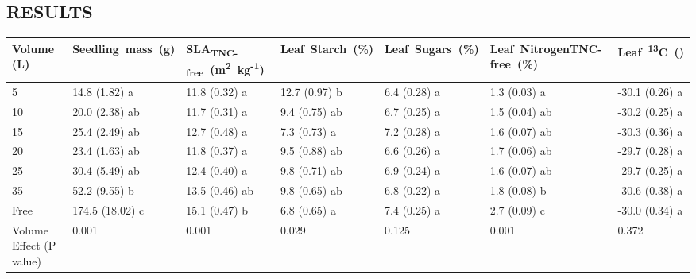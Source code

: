 \documentclass[a4paper]{article}
\begin{document}
\subsection*{RESULTS}

\begin{Schunk}
\begin{Soutput}
\begin{table}
\centering
\label{table:Table1}
\begin{tabular}{lllllll}
  \hline
Volume (L) & Seedling~mass~(g) & SLA\textsubscript{TNC-free}~(m\textsuperscript{2}~kg\textsuperscript{-1}) & Leaf~Starch~(\%) & Leaf~Sugars~(\%) & Leaf~Nitrogen{TNC-free}~(\%) & {Leaf~\textdelta}\textsuperscript{13}C~(\text{\textperthousand}) \\ 
  \hline
5 & 14.8 (1.82) a & 11.8 (0.32) a & 12.7 (0.97) b & 6.4 (0.28) a & 1.3 (0.03) a & -30.1 (0.26) a \\ 
  10 & 20.0 (2.38) ab & 11.7 (0.31) a & 9.4 (0.75) ab & 6.7 (0.25) a & 1.5 (0.04) ab & -30.2 (0.25) a \\ 
  15 & 25.4 (2.49) ab & 12.7 (0.48) a & 7.3 (0.73) a & 7.2 (0.28) a & 1.6 (0.07) ab & -30.3 (0.36) a \\ 
  20 & 23.4 (1.63) ab & 11.8 (0.37) a & 9.5 (0.88) ab & 6.6 (0.26) a & 1.7 (0.06) ab & -29.7 (0.28) a \\ 
  25 & 30.4 (5.49) ab & 12.4 (0.40) a & 9.8 (0.71) ab & 6.9 (0.24) a & 1.6 (0.07) ab & -29.7 (0.25) a \\ 
  35 & 52.2 (9.55) b & 13.5 (0.46) ab & 9.8 (0.65) ab & 6.8 (0.22) a & 1.8 (0.08) b & -30.6 (0.38) a \\ 
  Free & 174.5 (18.02) c & 15.1 (0.47) b & 6.8 (0.65) a & 7.4 (0.25) a & 2.7 (0.09) c & -30.0 (0.34) a \\ 
   \hline
Volume Effect (P value) & 0.001 & 0.001 & 0.029 & 0.125 & 0.001 & 0.372 \\ 
   \hline
\end{tabular}
\end{table}
\end{Soutput}
\end{Schunk}
\end{document}
